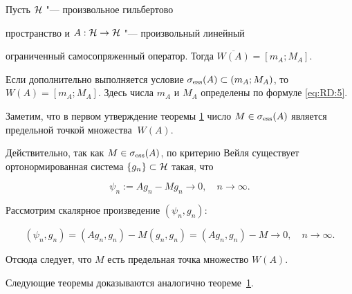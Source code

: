 \begin{remark}[1] Пусть ${\cal H}$ "--- произвольное гильбертово

пространство и $A: {\cal H} \to {\cal H}$ "--- произвольный линейный 

ограниченный самосопряженный оператор. Тогда $\overline{W(A)}=[m_A; M_A].$

Если дополнительно выполняется условие \linebreak $\sigma_{\rm ess}(A) \subset (m_A; M_A)$, то $W(A)=[m_A;

M_A]$. Здесь числа $m_A$ и $M_A$ определены по формуле \eqref{eq:RD:5}.

\end{remark}



\smallskip



Заметим, что в первом утверждение теоремы \hyperlink{RD:th1}{1} число $M \in \sigma_{\rm ess}(A)$ является предельной точкой множества $\ W(A)$.

Действительно, так как $M \in \sigma_{\rm ess}(A)$, по критерию Вейля существует ортонормированная система $\{g_n\} \subset {\cal H}$ такая, что

$$

\psi_n:=Ag_n-M g_n \rightarrow 0, \quad  n \rightarrow \infty.

$$

Рассмотрим скалярное произведение $(\psi_n,g_n)$:

$$

(\psi_n,g_n)=(Ag_n,g_n)-M(g_n,g_n)= (Ag_n,g_n)-M \rightarrow 0, \quad

n \rightarrow \infty.

$$

Отсюда следует, что $M$ есть предельная точка множество $W(A)$.



Следующие теоремы доказываются аналогично теореме~\hyperlink{RD:th1}{1}.



\smallskip






\hypertarget{RD:th2}{}



